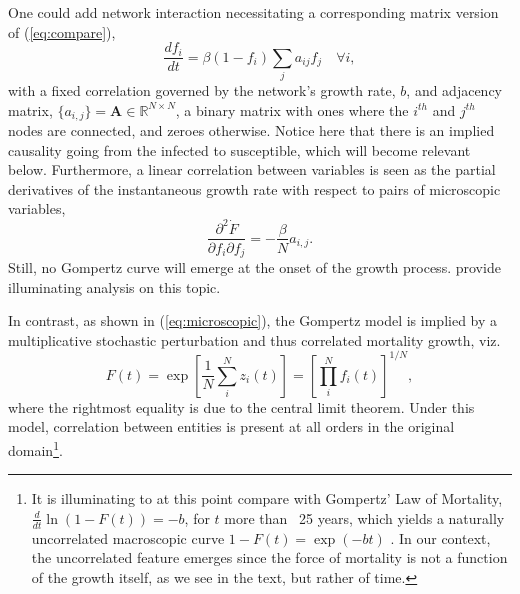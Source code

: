 \documentclass[review]{elsarticle}
\begin{document}
One could add network interaction necessitating a corresponding matrix version of (\ref{eq:compare}), 
\begin{equation}
\label{eq:networkSIR}
\frac{d f_i}{dt} = \beta (1-f_i)\sum_j{a_{ij}}f_j \quad \forall i,
\end{equation}
with a fixed correlation governed by the network's growth rate, $b$, and adjacency matrix, $\{a_{i,j}\}=\mathbf{A} \in \mathbb{R}^{N \times N}$, a binary matrix with ones where the $i^{th}$ and $j^{th}$ nodes are connected, and zeroes otherwise. Notice here that there is an implied causality going from the infected to susceptible, which will become relevant below. Furthermore, a linear correlation between variables is seen as the partial derivatives of the instantaneous growth rate with respect to pairs of microscopic variables,
\begin{equation}
\frac{\partial^2 \dot{F}}{\partial f_i \partial f_j} = -\frac{\beta}{N} a_{i,j}.
\end{equation}
Still, no Gompertz curve will emerge at the onset of the growth process. \citet{estrada2022networked} provide illuminating analysis on this topic.

In contrast, as shown in (\ref{eq:microscopic}), the Gompertz model is implied by a multiplicative stochastic perturbation and thus correlated mortality growth, viz.
\begin{equation}
F(t) = \exp{\left[\frac{1}{N}\sum_i^N z_i(t)\right]} = \left[\prod_i^N f_i(t)\right]^{1/N},
\end{equation}
where the rightmost equality is due to the central limit theorem. 
Under this model, correlation between entities is present at all orders in the original domain\footnote{It is illuminating to at this point compare with Gompertz' Law of Mortality, $\frac{d}{dt}\ln{(1 - F(t))} = -b$, for $t$ more than ~25 years, which yields a naturally uncorrelated macroscopic curve $1 - F(t) = \exp{(-bt)}$ \citep{shklovskii2005simple}. In our context, the uncorrelated feature emerges since the force of mortality is not a function of the growth itself, as we see in the text, but rather of time.}.
\end{document}
